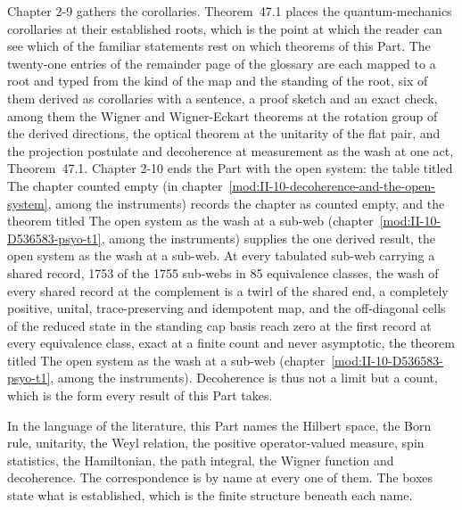 Chapter 2-9 gathers the corollaries. Theorem~47.1 places the quantum-mechanics corollaries at their established roots, which is the point at which the reader can see which of the familiar statements rest on which theorems of this Part. The twenty-one entries of the remainder page of the glossary are each mapped to a root and typed from the kind of the map and the standing of the root, six of them derived as corollaries with a sentence, a proof sketch and an exact check, among them the Wigner and Wigner-Eckart theorems at the rotation group of the derived directions, the optical theorem at the unitarity of the flat pair, and the projection postulate and decoherence at measurement as the wash at one act, Theorem~47.1. Chapter 2-10 ends the Part with the open system: the table titled The chapter counted empty (in chapter~\ref{mod:II-10-decoherence-and-the-open-system}, among the instruments) records the chapter as counted empty, and the theorem titled The open system as the wash at a sub-web (chapter~\ref{mod:II-10-D536583-psyo-t1}, among the instruments) supplies the one derived result, the open system as the wash at a sub-web. At every tabulated sub-web carrying a shared record, 1753 of the 1755 sub-webs in 85 equivalence classes, the wash of every shared record at the complement is a twirl of the shared end, a completely positive, unital, trace-preserving and idempotent map, and the off-diagonal cells of the reduced state in the standing cap basis reach zero at the first record at every equivalence class, exact at a finite count and never asymptotic, the theorem titled The open system as the wash at a sub-web (chapter~\ref{mod:II-10-D536583-psyo-t1}, among the instruments). Decoherence is thus not a limit but a count, which is the form every result of this Part takes.

In the language of the literature, this Part names the Hilbert space, the Born rule, unitarity, the Weyl relation, the positive operator-valued measure, spin statistics, the Hamiltonian, the path integral, the Wigner function and decoherence. The correspondence is by name at every one of them. The boxes state what is established, which is the finite structure beneath each name.


